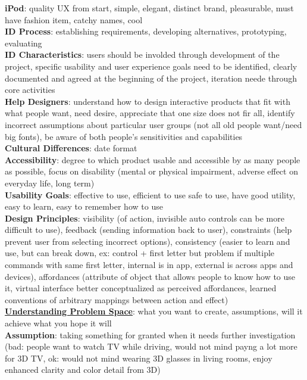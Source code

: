 \documentclass[a4paper]{article}
\begin{document}
\begin{multicols}{2}
        \textbf{iPod}: quality UX from start, simple, elegant, distinct brand, pleasurable, must have fashion item, catchy names, cool\\
        \textbf{ID Process}: establishing requirements, developing alternatives, prototyping, evaluating\\
        \textbf{ID Characteristics}: users should be involded through development of the project, specific usability and user experience goals need to be identified, clearly documented and agreed at the beginning of the project, iteration neede through core activities\\
        \textbf{Help Designers}: understand how to design interactive products that fit with what people want, need desire, appreciate that one size does not fir all, identify incorrect assumptions about particular user groups (not all old people want/need big fonts), be aware of both people's sensitivities and capabilities\\
        \textbf{Cultural Differences}: date format\\
        \textbf{Accessibility}: degree to which product usable and accessible by as many people as possible, focus on disability (mental or physical impairment, adverse effect on everyday life, long term)\\
        \textbf{Usability Goals}: effective to use, efficient to use safe to use, have good utility, easy to learn, easy to remember how to use\\
        \textbf{Design Principles}: visibility (of action, invisible auto controls can be more difficult to use), feedback (sending information back to user), constraints (help prevent user from selecting incorrect options), consistency (easier to learn and use, but can break down, ex: control + first letter but problem if multiple commands with same first letter, internal is in app, external is across apps and devices), affordances (attribute of object that allows people to know how to use it, virtual interface better conceptualized as perceived affordances, learned conventions of arbitrary mappings between action and effect)\\
        \underline{\textbf{Understanding Problem Space}}: what you want to create, assumptions, will it achieve what you hope it will\\
        \textbf{Assumption}: taking something for granted when it needs further investigation (bad: people want to watch TV while driving, would not mind payng a lot more for 3D TV, ok: would not mind wearing 3D glasses in living rooms, enjoy enhanced clarity and color detail from 3D)\\

\end{multicols}
\end{document}
